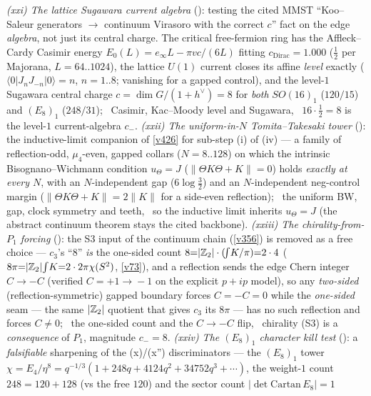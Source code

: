 \emph{(xxi) The lattice Sugawara current algebra} (): testing the cited MMST
``Koo--Saleur generators $\to$ continuum Virasoro with the correct $c$'' fact on the edge \emph{algebra}, not just
its central charge. The critical free-fermion ring has the Affleck--Cardy Casimir energy $E_0(L){=}e_\infty L{-}\pi v
c/(6L)$ fitting $c_{\mathrm{Dirac}}{=}1.000$ ($\tfrac12$ per Majorana, $L{=}64..1024$), the lattice $U(1)$ current
closes its affine \emph{level} exactly ($\langle0|J_nJ_{-n}|0\rangle{=}n$, $n{=}1..8$; vanishing for a gapped
control), and the level-$1$ Sugawara central charge $c{=}\dim G/(1{+}h^\vee){=}8$ for \emph{both} $SO(16)_1$
($120/15$) and $(E_8)_1$ ($248/31$); \mE\ Casimir, Kac--Moody level and Sugawara, \mC\ $16{\cdot}\tfrac12{=}8$ is the
level-$1$ current-algebra $c_-$. \emph{(xxii) The uniform-in-$N$ Tomita--Takesaki tower}
(): the inductive-limit companion of \vref{v426} for sub-step (i) of (iv) --- a
family of reflection-odd, $\mu_4$-even, gapped collars ($N{=}8..128$) on which the intrinsic Bisognano--Wichmann
condition $u_\Theta{=}J$ ($\|\Theta K\Theta{+}K\|{=}0$) holds \emph{exactly at every $N$}, with an $N$-independent gap
($6\log\tfrac32$) and an $N$-independent neg-control margin ($\|\Theta K\Theta{+}K\|{=}2\|K\|$ for a side-even
reflection); \mE\ the uniform BW, gap, clock symmetry and teeth, \mC\mO\ so the inductive limit inherits
$u_\Theta{=}J$ (the abstract continuum theorem stays the cited backbone). \emph{(xxiii) The chirality-from-$P_1$
forcing} (): the S3 input of the continuum chain (\vref{v356}) is removed as
a free choice --- $c_3$'s ``$8$'' \emph{is} the one-sided count $8{=}|\mathbb Z_2|\cdot(\!\int\!K/\pi){=}2\cdot4$
($8\pi{=}|\mathbb Z_2|\!\int\!K{=}2\cdot2\pi\chi(S^2)$, \vref{v73}), and a reflection sends the edge Chern integer
$C{\to}{-}C$ (verified $C{=}{+}1\!\to\!{-}1$ on the explicit $p{+}ip$ model), so any \emph{two-sided}
(reflection-symmetric) gapped boundary forces $C{=}{-}C{=}0$ while the \emph{one-sided} seam --- the same $|\mathbb Z_2|$
quotient that gives $c_3$ its $8\pi$ --- has no such reflection and forces $C{\neq}0$; \mE\ the one-sided count and
the $C{\to}{-}C$ flip, \mC\ chirality (S3) is a \emph{consequence} of $P_1$, magnitude $c_-{=}8$. \emph{(xxiv) The
$(E_8)_1$ character kill test} (): a \emph{falsifiable} sharpening of the
(x)/(x'') discriminators --- the $(E_8)_1$ tower $\chi{=}E_4/\eta^8{=}q^{-1/3}(1{+}248q{+}4124q^2{+}34752q^3{+}\cdots)$,
the weight-$1$ count $248{=}120{+}128$ (vs the free $120$) and the sector count $|\!\det\mathrm{Cartan}\,E_8|{=}1$
